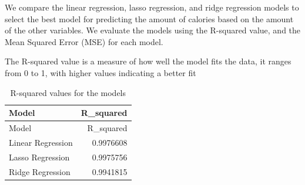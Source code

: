 \documentclass[
]{article}
\newenvironment{Shaded}{\begin{snugshade}}{\end{snugshade}}
\newcommand{\AttributeTok}[1]{\textcolor[rgb]{0.13,0.29,0.53}{#1}}
\newcommand{\DecValTok}[1]{\textcolor[rgb]{0.00,0.00,0.81}{#1}}
\newcommand{\FunctionTok}[1]{\textcolor[rgb]{0.13,0.29,0.53}{\textbf{#1}}}
\newcommand{\NormalTok}[1]{#1}
\newcommand{\OtherTok}[1]{\textcolor[rgb]{0.56,0.35,0.01}{#1}}
\newcommand{\SpecialCharTok}[1]{\textcolor[rgb]{0.81,0.36,0.00}{\textbf{#1}}}
\newcommand{\StringTok}[1]{\textcolor[rgb]{0.31,0.60,0.02}{#1}}
\begin{document}
We compare the linear regression, lasso regression, and ridge regression
models to select the best model for predicting the amount of calories
based on the amount of the other variables. We evaluate the models using
the R-squared value, and the Mean Squared Error (MSE) for each model.

The R-squared value is a measure of how well the model fits the data, it
ranges from 0 to 1, with higher values indicating a better fit

\begin{Shaded}
\end{Shaded}

\begin{longtable}[]{@{}lr@{}}
\caption{R-squared values for the models}\tabularnewline
\toprule\noalign{}
Model & R\_squared \\
\midrule\noalign{}
\endfirsthead
\toprule\noalign{}
Model & R\_squared \\
\midrule\noalign{}
\endhead
\bottomrule\noalign{}
\endlastfoot
Linear Regression & 0.9976608 \\
Lasso Regression & 0.9975756 \\
Ridge Regression & 0.9941815 \\
\end{longtable}
\end{document}
